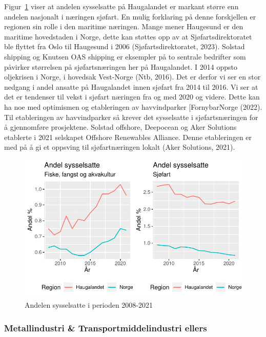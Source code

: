 \documentclass[
]{article}
\begin{document}
Figur~\ref{fig-ffa} viser at andelen sysselsatte på Haugalandet er
markant større enn andelen nasjonalt i næringen sjøfart. En mulig
forklaring på denne forskjellen er regionen sin rolle i den maritime
næringen. Mange mener Haugesund er den maritime hovedstaden i Norge,
dette kan støttes opp av at Sjøfartsdirektoratet ble flyttet fra Oslo
til Haugesund i 2006 (Sjøfartsdirektoratet, 2023). Solstad shipping og
Knutsen OAS shipping er eksempler på to sentrale bedrifter som påvirker
størrelsen på sjøfartsnæringen her på Haugalandet. I 2014 oppsto
oljekrisen i Norge, i hovedsak Vest-Norge (Ntb, 2016). Det er derfor vi
ser en stor nedgang i andel ansatte på Haugalandet innen sjøfart fra
2014 til 2016. Vi ser at det er tendenser til vekst i sjøfart næringen
fra og med 2020 og videre. Dette kan ha noe med optimismen og
etableringen av havvindparker {[}FornybarNorge (2022). Til etableringen
av havvindparker så krever det sysselsatte i sjøfartsnæringen for å
gjennomføre prosjektene. Solstad offshore, Deepocean og Aker Solutions
etablerte i 2021 selskapet Offshore Renewables Alliance. Denne
etableringen er med på å gi et oppsving til sjøfartnæringen lokalt (Aker
Solutions, 2021).

\begin{figure}[H]

{\centering \includegraphics{Masteroppgave_files/figure-pdf/fig-ffa-1.pdf}

}

\caption{\label{fig-ffa}Andelen sysselsatte i perioden 2008-2021}

\end{figure}

\hypertarget{metallindustri-transportmiddelindustri-ellers}{%
\subsubsection{Metallindustri \& Transportmiddelindustri
ellers}\label{metallindustri-transportmiddelindustri-ellers}}
\end{document}

